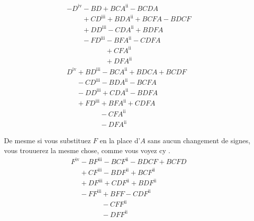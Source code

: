 \documentclass[11pt,a4paper]{article}
\begin{document}
\[ \begin{array}{l} -D^{\mathrm{iv}} - BD + BCA^{\mathrm{ii}} - BCDA \\ \phantom{-D^{\mathrm{iv}}} + CD^{\mathrm{iii}} + BDA^{\mathrm{ii}} + BCFA - BDCF \\ \phantom{-D^{\mathrm{iv}}} + DD^{\mathrm{iii}} - CDA^{\mathrm{ii}} + BDFA \\ \phantom{-D^{\mathrm{iv}}} - FD^{\mathrm{iii}} - BFA^{\mathrm{ii}} - CDFA \\ \phantom{-D^{\mathrm{iv}} - FD^{\mathrm{iii}}} + CFA^{\mathrm{ii}} \\ \phantom{-D^{\mathrm{iv}} - FD^{\mathrm{iii}}} + DFA^{\mathrm{ii}} \\ \hline D^{\mathrm{iv}} + BD^{\mathrm{iii}} - BCA^{\mathrm{ii}} + BDCA + BCDF \\ \phantom{D^{\mathrm{iv}}} - CD^{\mathrm{iii}} - BDA^{\mathrm{ii}} - BCFA \\ \phantom{D^{\mathrm{iv}}} - DD^{\mathrm{iii}} + CDA^{\mathrm{ii}} - BDFA \\ \phantom{D^{\mathrm{iv}}} + FD^{\mathrm{iii}} + BFA^{\mathrm{ii}} + CDFA \\ \phantom{D^{\mathrm{iv}} + FD^{\mathrm{iii}}} - CFA^{\mathrm{ii}} \\ \phantom{D^{\mathrm{iv}} + FD^{\mathrm{iii}}} - DFA^{\mathrm{ii}} \end{array} \]

De mesme si vous substituez $F$ en la place d'$A$ sans aucun changement de signes, vous trouuerez la mesme chose, comme vous voyez cy .
\[ \begin{array}{l} F^{\mathrm{iv}} - BF^{\mathrm{iii}} - BCF^{\mathrm{ii}} - BDCF + BCFD \\ \phantom{F^{\mathrm{iv}}} + CF^{\mathrm{iii}} - BDF^{\mathrm{ii}} + BCF^{\mathrm{ii}} \\ \phantom{F^{\mathrm{iv}}} + DF^{\mathrm{iii}} + CDF^{\mathrm{ii}} + BDF^{\mathrm{ii}} \\ \phantom{F^{\mathrm{iv}}} - FF^{\mathrm{iii}} + BFF - CDF^{\mathrm{ii}} \\ \phantom{F^{\mathrm{iv}} - FF^{\mathrm{iii}}} - CFF^{\mathrm{ii}} \\ \phantom{F^{\mathrm{iv}} - FF^{\mathrm{iii}}} - DFF^{\mathrm{ii}} \end{array} \]
\end{document}
